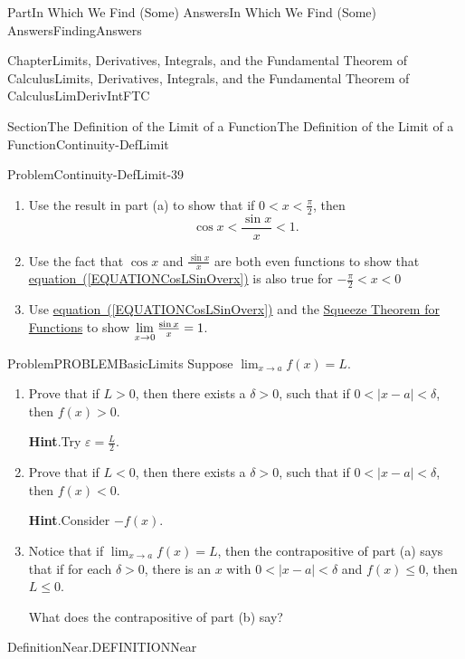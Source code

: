 \documentclass[oneside,10pt,]{book}
\newcommand{\blocktitlefont}{\relax}
\newcommand{\xreffont}{\relax}
\numberwithin{equation}{part}
\def\limit#1#2#3{{\displaystyle\lim_{#1\rightarrow #2}#3}}
\def\limitt#1#2#3{{\displaystyle\lim_{#1\rightarrow #2}\textstyle #3}}
\newcommand{\eps}{\varepsilon}
\newcommand{\lt}{<}
\newcommand{\gt}{>}
\begin{document}
\begin{partptx}{Part}{In Which We Find (Some) Answers}{}{In Which We Find (Some) Answers}{}{}{FindingAnswers}
\begin{chapterptx}{Chapter}{Limits, Derivatives, Integrals, and the Fundamental Theorem of Calculus}{}{Limits, Derivatives, Integrals, and the Fundamental Theorem of Calculus}{}{}{LimDerivIntFTC}
\begin{sectionptx}{Section}{The Definition of the Limit of a Function}{}{The Definition of the Limit of a Function}{}{}{Continuity-DefLimit}
\begin{problem}{Problem}{}{Continuity-DefLimit-39}
\begin{enumerate}[font=\bfseries,label=(\alph*),ref=\alph*]
\begin{equation*}
OAC)\lt \text{ area } (\Delta OAB) 
\end{equation*}
%
\item{}Use the result in part (a) to show that if \(0\lt x\lt
\frac{\pi}{2}\), then%
\begin{equation}
\cos x\lt \frac{\sin x}{x}\lt 1 \text{.}\label{EQUATIONCosLSinOverx}
\end{equation}
%
\item{}Use the fact that \(\cos x\) and \(\frac{\sin
x}{x}\) are both even functions to show that  \hyperref[EQUATIONCosLSinOverx]{equation~({\xreffont\ref{EQUATIONCosLSinOverx}})} is also true for \(-\frac{\pi}{2}\lt x\lt 0\)%
\item{}Use \hyperref[EQUATIONCosLSinOverx]{equation~({\xreffont\ref{EQUATIONCosLSinOverx}})} and the \hyperref[thm_SqueezeTheoremFunctions]{Squeeze Theorem for Functions} to show \(\limitt{x}{0}{\textstyle\frac{\sin x}{x}}=1\).%
\end{enumerate}%
\end{problem}
\begin{problem}{Problem}{}{PROBLEMBasicLimits}%
Suppose \(\limitt{x}{a}{ f(x)}=L\).%
\begin{enumerate}[font=\bfseries,label=(\alph*),ref=\alph*]%
\item{}Prove that if \(L\gt0\), then there exists a \(\delta >0\), such that if \(0\lt\left|x-a\right|\lt\delta \), then \(f\left(x\right)>0\).%
\par\smallskip%
\noindent\textbf{\blocktitlefont Hint}.\hypertarget{PROBLEMBasicLimits-2-2}{}\quad{}Try \(\eps =\frac{L}{2}\).%
\item{}Prove that if \(L\lt0\), then there exists a \(\delta >0\), such that if \(0\lt\left|x-a\right|\lt\delta\), then \(f\left(x\right)\lt0\).%
\par\smallskip%
\noindent\textbf{\blocktitlefont Hint}.\hypertarget{PROBLEMBasicLimits-3-2}{}\quad{}Consider \(-f(x)\).%
\item{}Notice that if \(\limit{x}{a}{f(x)}=L\), then the contrapositive of part (a) says that if for each \(\delta >0\), there is an \(x\) with \(0\lt\left|x-a\right|\lt\delta \) and \(f\left(x\right)\le
0\), then \(L\le 0\).%
\par
What does the contrapositive of part (b) say?%
\end{enumerate}%
\end{problem}
\begin{definition}{Definition}{Near.}{DEFINITIONNear}%

\end{definition}
\end{sectionptx}
\end{chapterptx}
\end{partptx}
\end{document}
